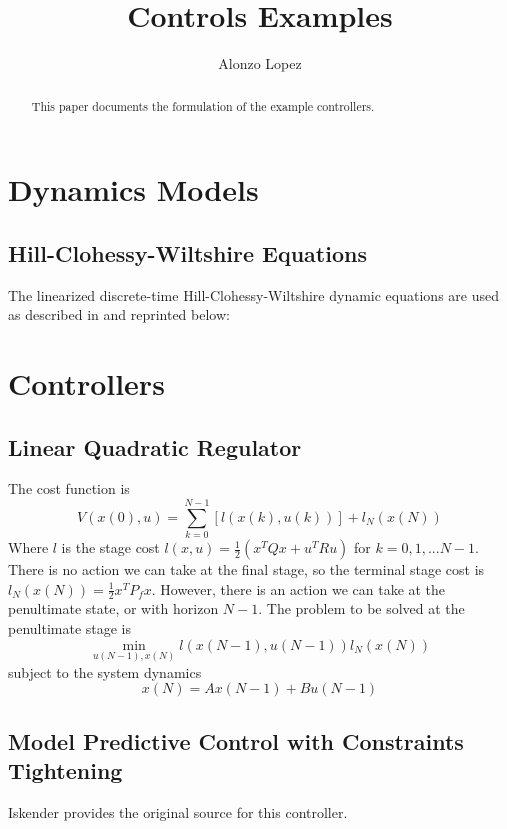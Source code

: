 \documentclass{article}
\title{Controls Examples}
\author{Alonzo Lopez}
\begin{document}
\maketitle

\begin{abstract}
    This paper documents the formulation of the example controllers.
\end{abstract}

\section{Dynamics Models}
\subsection{Hill-Clohessy-Wiltshire Equations}
The linearized discrete-time Hill-Clohessy-Wiltshire dynamic equations are used as described in \cite{2017_Jewison} and reprinted below:

\section{Controllers}
\subsection{Linear Quadratic Regulator}
The cost function is 
$$V(x(0), u) = \sum\limits_{k=0}^{N-1}[l(x(k), u(k))] + l_N(x(N))$$
Where $l$ is the stage cost $l(x,u) = \frac{1}{2}(x^TQx + u^TRu)$ for $k=0,1,...N-1$.
There is no action we can take at the final stage, so the terminal stage cost is $l_N(x(N)) = \frac{1}{2}x^TP_fx$. 
However, there is an action we can take at the penultimate state, or with horizon $N-1$. 
The problem to be solved at the penultimate stage is 
$$\min\limits_{u(N-1), x(N)} l(x(N-1), u(N-1)) l_N(x(N))$$
subject to the system dynamics 
$$x(N) = Ax(N-1) + Bu(N-1)$$

\subsection{Model Predictive Control with Constraints Tightening}
Iskender \cite{2018_Iskender} provides the original source for this controller.

\printbibliography
\end{document}
